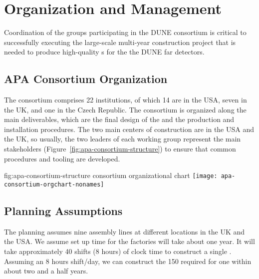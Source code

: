 \section{Organization and Management}
\label{sec:fdsp-apa-org}

Coordination of the groups participating in the DUNE  consortium is critical to successfully executing the large-scale multi-year construction project that is needed to produce high-quality s for the the DUNE far detectors.  


\subsection{APA Consortium Organization}
\label{sec:fdsp-apa-org-consortium}

The  consortium comprises \num{22} institutions, of which \num{14} are in the USA, seven in the UK, and one in the Czech Republic. The consortium is organized along the main deliverables, which are the final design of the  and the  production and installation procedures. The two main centers of  construction are in the USA and the UK, so usually, the two leaders of each working group represent the main stakeholders (Figure~\ref{fig:apa-consortium-structure}) to ensure that common procedures and tooling are developed. 

\begin{dunefigure}{fig:apa-consortium-structure}
{ consortium organizational chart}
\texttt{[image: apa-consortium-orgchart-nonames]}
\end{dunefigure}


\subsection{Planning Assumptions}
\label{sec:fdsp-apa-org-assmp}

The planning assumes nine  assembly lines at different locations in the UK and the USA. 
We assume set up time for the factories will take about one year.
It will take approximately \num{40} shifts (8 hours) of clock time  to construct a single . Assuming an 8 hours shift/day, we can construct the \num{150}  required for one  %
within about two and a half years.

